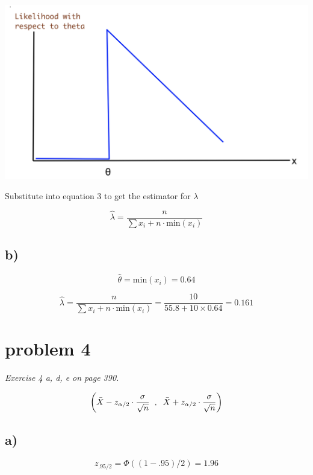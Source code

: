 \documentclass[a4paper,11pt]{article}
\begin{document}
\begin{center}
  \includegraphics[scale=0.4]{picture_3a.png}
\end{center}

Substitute into equation $3$ to get the estimator for $\lambda$

\[\hat{\lambda} = \frac{n}{\sum{x_i} + n \cdot \text{min}(x_i)} \]

\vspace{3cm}

\subsection*{b)}

\[
  \hat{\theta} = \text{min}(x_i) = 0.64
\]

\[
  \hat{\lambda} 
  = \frac{n}{\sum{x_i} + n \cdot \text{min}(x_i)}
  = \frac{10}{55.8 + 10 \times 0.64} 
  = 0.161
\]

\clearpage

\section*{problem 4}

\textit{Exercise 4 a, d, e on page 390.}

\[ \left(\bar{X} - z_{\alpha/2} \cdot \frac{\sigma}{\sqrt{n}} \hspace{2mm}, \hspace{2mm} \bar{X} + z_{\alpha/2} \cdot \frac{\sigma}{\sqrt{n}} \right)\]

\subsection*{a)}

\[z_{.95/2} = \Phi((1 - .95)/2) = 1.96 \]
\end{document}
